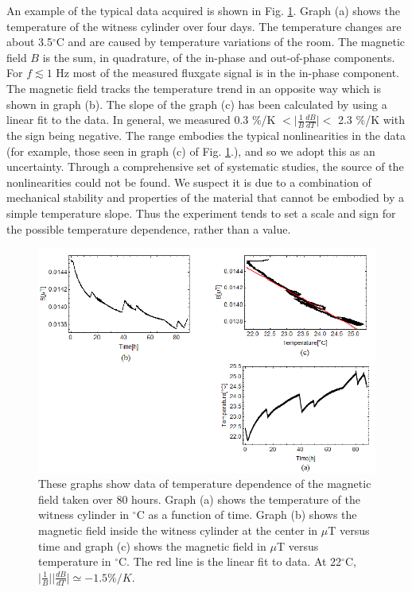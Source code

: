 \documentclass[review]{elsarticle}
\begin{document}
An example of the typical data acquired is shown in Fig. \ref{fig:B_vs_Temp}. Graph (a) shows the temperature of the witness cylinder over four days. The temperature changes are about 3.5$^\circ$C and are caused by temperature variations of the room. The magnetic field $B$ is the sum, in quadrature, of the in-phase and out-of-phase components. For $f\lesssim 1$ Hz most of the measured fluxgate signal is in the in-phase component. The magnetic field tracks the temperature trend in an opposite way which is shown in graph (b). The slope of the graph (c) has been calculated by using a linear fit to the data. In general, we measured 0.3 \%/K $< \vert \frac{1}{B} \frac{dB}{dT} \vert <$ 2.3 \%/K with the sign being negative. The range embodies the typical nonlinearities in the data (for example, those seen in graph (c) of Fig. \ref{fig:B_vs_Temp}.), and so we adopt this as an uncertainty. Through a comprehensive set of systematic studies, the source of the nonlinearities could not be found. We suspect it is due to a combination of mechanical stability and properties of the material that cannot be embodied by a simple temperature slope. Thus the experiment tends to set a scale and sign for the possible temperature dependence, rather than a value.
  \begin{figure}[h!]
\begin{center}
   \includegraphics[width=1\textwidth]{B_vs_T.PNG}
    \caption{These graphs show data of temperature dependence of the magnetic field taken over 80 hours. Graph (a) shows the temperature of the witness cylinder in $^\circ$C as a function of time. Graph (b) shows the magnetic field inside the witness cylinder at the center in $\mu$T versus time and graph (c) shows the magnetic field in $\mu$T versus temperature in $^\circ$C. The red line is the linear fit to data. At 22$^\circ$C, $\vert \frac{1}{B}\vert \vert \frac{dB}{dT}\vert\simeq -1.5 \% /K.$ }
    \label{fig:B_vs_Temp}
     \vspace{-2.em}
    \end{center}
\end{figure} 
\end{document}
